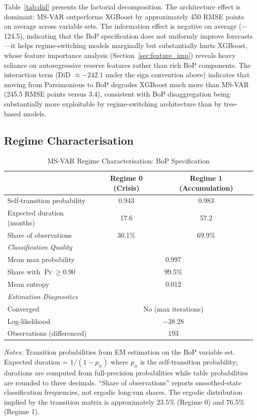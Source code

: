 \documentclass[12pt,a4paper]{article}
\begin{document}
Table~\ref{tab:did} presents the factorial decomposition. The architecture effect is dominant: MS-VAR outperforms XGBoost by approximately 450 RMSE points on average across variable sets. The information effect is negative on average ($-$124.5), indicating that the BoP specification does not uniformly improve forecasts---it helps regime-switching models marginally but substantially hurts XGBoost, whose feature importance analysis (Section~\ref{sec:feature_imp}) reveals heavy reliance on autoregressive reserve features rather than rich BoP components. The interaction term (DiD $\approx -242.1$ under the sign convention above) indicates that moving from Parsimonious to BoP degrades XGBoost much more than MS-VAR (245.5 RMSE points versus 3.4), consistent with BoP disaggregation being substantially more exploitable by regime-switching architecture than by tree-based models.

\subsection{Regime Characterisation}
\label{sec:regime_char}

\begin{table}[htbp]
\centering
\caption{MS-VAR Regime Characterisation: BoP Specification}
\label{tab:regime_char}
\begin{tabular}{lcc}
\toprule
& Regime 0 (Crisis) & Regime 1 (Accumulation) \\
\midrule
Self-transition probability & 0.943 & 0.983 \\
Expected duration (months) & 17.6 & 57.2 \\
Share of observations & 30.1\% & 69.9\% \\
\midrule
\multicolumn{3}{l}{\textit{Classification Quality}} \\
Mean max probability & \multicolumn{2}{c}{0.997} \\
Share with $\Pr \geq 0.90$ & \multicolumn{2}{c}{99.5\%} \\
Mean entropy & \multicolumn{2}{c}{0.012} \\
\midrule
\multicolumn{3}{l}{\textit{Estimation Diagnostics}} \\
Converged & \multicolumn{2}{c}{No (max iterations)} \\
Log-likelihood & \multicolumn{2}{c}{$-$38.28} \\
Observations (differenced) & \multicolumn{2}{c}{193} \\
\bottomrule
\end{tabular}
\begin{tablenotes}
\small
\item \textit{Notes:} Transition probabilities from EM estimation on the BoP variable set. Expected duration = $1/(1-p_{ii})$ where $p_{ii}$ is the self-transition probability; durations are computed from full-precision probabilities while table probabilities are rounded to three decimals. ``Share of observations'' reports smoothed-state classification frequencies, not ergodic long-run shares. The ergodic distribution implied by the transition matrix is approximately 23.5\% (Regime 0) and 76.5\% (Regime 1).
\end{tablenotes}
\end{table}
\end{document}

